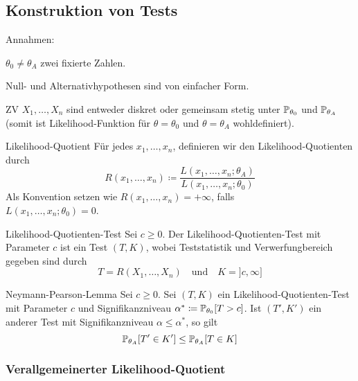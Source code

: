 \staredssubend

\subsection*{Konstruktion von Tests}%
\label{sub:konstruktion_von_tests}

Annahmen:
\begin{itemize*}
	\item $\theta_0 \neq \theta_A$ zwei fixierte Zahlen.
	\item Null- und Alternativhypothesen sind von einfacher Form.
	\item ZV $X_1 , \ldots , X_n$ sind entweder diskret oder gemeinsam stetig unter $\mathbb{P}_{\theta_0}$ und $\mathbb{P}_{\theta_A}$
		(somit ist Likelihood-Funktion für $\theta = \theta_0$ und $\theta = \theta_A$ wohldefiniert).
\end{itemize*}
\begin{definition}{Likelihood-Quotient}
	Für jedes $x_1 , \ldots , x_n$, definieren wir den Likelihood-Quotienten durch
	\begin{equation*}
		R(x_1 , \ldots , x_n) \coloneqq \frac{L(x_1 , \ldots , x_n ; \theta_A)}{L (x_1 , \ldots , x_n; \theta_0)} 
	\end{equation*}
	Als Konvention setzen wie $R (x_1 , \ldots , x_n) = + \infty$, falls\\ $L(x_1 , \ldots , x_n; \theta_0) = 0$.
\end{definition}
\begin{definition}{Likelihood-Quotienten-Test}
	Sei $c \geq 0$. Der Likelihood-Quotienten-Test mit Parameter $c$ ist ein Test $(T,K)$, wobei Teststatistik und
	Verwerfungbereich gegeben sind durch
	\begin{equation*}
		T = R(X_1, \ldots , X_n) \quad\text{und}\quad K = ]c,\infty]
	\end{equation*}
\end{definition}
\begin{theorem}{Neymann-Pearson-Lemma}
	Sei $c \geq 0$. Sei $(T,K)$ ein Likelihood-Quotienten-Test mit Parameter $c$ und Signifikanzniveau $\alpha^*
	\coloneqq \mathbb{P}_{\theta_0}[T > c]$. Ist $(T',K')$ ein anderer Test mit Signifikanzniveau $\alpha \leq \alpha^*$, so
	gilt
	\begin{equation*}
		\mathbb{P}_{\theta_A} [T' \in K'] \leq \mathbb{P}_{\theta_A} [T \in K]
	\end{equation*}
\end{theorem}

\subsubsection*{Verallgemeinerter Likelihood-Quotient}%
\label{ssub:verallgemeinerten_likelihood_quotient}

